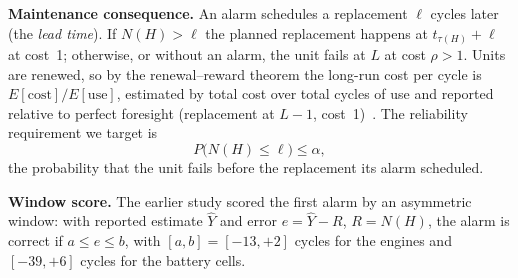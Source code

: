 \textbf{Maintenance consequence.} An alarm schedules a replacement $\ell$ cycles later (the \emph{lead time}). If $N(H)>\ell$ the planned replacement happens at $t_{\tau(H)}+\ell$ at cost~1; otherwise, or without an alarm, the unit fails at $L$ at cost $\rho>1$. Units are renewed, so by the renewal--reward theorem the long-run cost per cycle is $E[\text{cost}]/E[\text{use}]$, estimated by total cost over total cycles of use and reported relative to perfect foresight (replacement at $L-1$, cost~1)~\cite{barlow1960}. The reliability requirement we target is
\[
P\bigl(N(H)\le\ell\bigr)\le\alpha ,
\]
the probability that the unit fails before the replacement its alarm scheduled.

\textbf{Window score.} The earlier study scored the first alarm by an asymmetric window: with reported estimate $\hat Y$ and error $e=\hat Y-R$, $R=N(H)$, the alarm is correct if $a\le e\le b$, with $[a,b]=[-13,+2]$ cycles for the engines and $[-39,+6]$ cycles for the battery cells.
